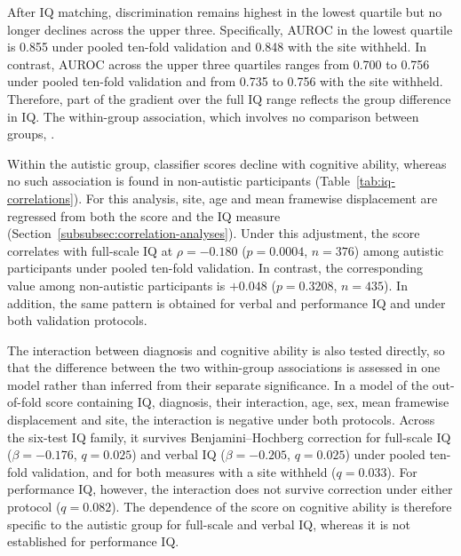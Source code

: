 After IQ matching, discrimination remains highest in the lowest quartile but no longer
declines across the upper three. Specifically, AUROC in the lowest quartile is 0.855 under
pooled ten-fold validation and 0.848 with the site withheld. In contrast, AUROC across the
upper three quartiles ranges from 0.700 to 0.756 under pooled ten-fold validation and from
0.735 to 0.756 with the site withheld. Therefore, part of the gradient over the full IQ
range reflects the group difference in IQ. The within-group association, which involves no
comparison between groups, .

Within the autistic group, classifier scores decline with cognitive ability, whereas no
such association is found in non-autistic participants (Table~\ref{tab:iq-correlations}). For this
analysis, site, age and mean framewise displacement are regressed from both the score and
the IQ measure (Section~\ref{subsubsec:correlation-analyses}). Under this adjustment, the score correlates with
full-scale IQ at $\rho=-0.180$ ($p=0.0004$, $n=376$) among autistic participants under
pooled ten-fold validation. In contrast, the corresponding value among non-autistic
participants is $+0.048$ ($p=0.3208$, $n=435$). In addition, the same pattern is obtained
for verbal and performance IQ and under both validation protocols.

The interaction between diagnosis and cognitive ability is also tested directly, so that the
difference between the two within-group associations is assessed in one model rather than
inferred from their separate significance. In a model of the out-of-fold score containing IQ,
diagnosis, their interaction, age, sex, mean framewise displacement and site, the interaction
is negative under both protocols. Across the six-test IQ family, it survives
Benjamini--Hochberg correction for full-scale IQ ($\beta=-0.176$, $q=0.025$) and verbal IQ
($\beta=-0.205$, $q=0.025$) under pooled ten-fold validation, and for both measures with a
site withheld ($q=0.033$). For performance IQ, however, the interaction does not survive
correction under either protocol ($q=0.082$). The dependence of the score on cognitive ability
is therefore specific to the autistic group for full-scale and verbal IQ, whereas it is not
established for performance IQ.

